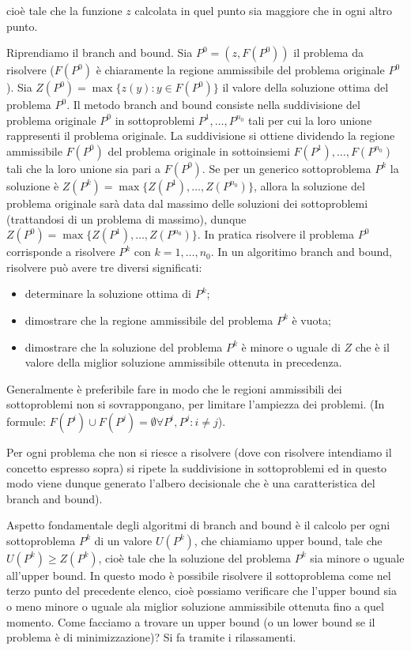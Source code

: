 \documentclass[11pt]{book}
\begin{document}
cio\`e tale che la funzione $z$ calcolata in quel punto sia maggiore
che in ogni altro punto.


Riprendiamo il branch and bound. Sia $P^0 = (z, F(P^0))$ il problema
da risolvere ($F(P^0)$ \`e chiaramente la regione ammissibile del
problema originale $P^0$). Sia $Z(P^0) = \max \{ z(y) : y \in F(P^0)
\}$ il valore della soluzione ottima del problema $P^0$. Il metodo
branch and bound consiste nella suddivisione del problema originale
$P^0$ in sottoproblemi $P^1,\dots,P^{n_0}$ tali per cui la loro unione
rappresenti il problema originale. La suddivisione si ottiene
dividendo la regione ammissibile $F(P^0)$ del problema originale in
sottoinsiemi $F(P^1),\dots,F(P^{n_0})$ tali che la loro unione sia
pari a $F(P^0)$. Se per un generico sottoproblema $P^k$ la soluzione
\`e $Z(P^k) = \max \{ Z(P^1), \dots, Z(P^{n_0})\}$, allora la soluzione
del problema originale sar\`a data dal massimo delle soluzioni dei
sottoproblemi (trattandosi di un problema di massimo), dunque $Z(P^0)
= \max \{ Z(P^1), \dots, Z(P^{n_0}) \}$. In pratica risolvere il
problema $P^0$ corrisponde a risolvere $P^k$ con $k = 1, \dots,
n_0$. In un algoritimo branch and bound, risolvere pu\`o avere tre
diversi significati:

\begin{itemize}
\item determinare la soluzione ottima di $P^k$;
\item dimostrare che la regione ammissibile del problema $P^k$ \`e vuota;
\item dimostrare che la soluzione del problema $P^k$ \`e minore o
  uguale di $Z$ che \`e il valore della miglior soluzione ammissibile
  ottenuta in precedenza.
\end{itemize}

Generalmente \`e preferibile fare in modo che le regioni ammissibili
dei sottoproblemi non si sovrappongano, per limitare l'ampiezza dei
problemi. (In formule: $F(P^i) \cup F(P^j) = \emptyset \forall P^i,
P^j : i \neq j$).

Per ogni problema che non si riesce a risolvere (dove con risolvere
intendiamo il concetto espresso sopra) si ripete la suddivisione in
sottoproblemi ed in questo modo viene dunque generato l'albero
decisionale che \`e una caratteristica del branch and bound).

Aspetto fondamentale degli algoritmi di branch and bound \`e il calcolo
per ogni sottoproblema $P^k$ di un valore $U(P^k)$, che chiamiamo
upper bound, tale che $U(P^k) \geq Z(P^k)$, cio\`e tale che la
soluzione del problema $P^k$ sia minore o uguale all'upper bound. In
questo modo \`e possibile risolvere il sottoproblema come nel terzo
punto del precedente elenco, cio\`e possiamo verificare che l'upper
bound sia o meno minore o uguale ala miglior soluzione ammissibile
ottenuta fino a quel momento. Come facciamo a trovare un upper bound
(o un lower bound se il problema \`e di minimizzazione)? Si fa tramite
i rilassamenti.
\end{document}
